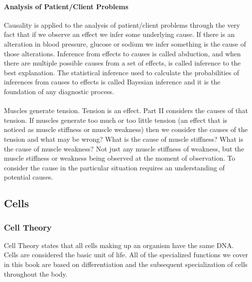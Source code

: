 \paragraph{Analysis of Patient/Client Problems}
Causality is applied to the analysis of patient/client problems through the very fact that if we observe an effect we infer some underlying cause. If there is an alteration in blood pressure, glucose or sodium we infer something is the cause of those alterations. Inference from effects to causes is called abduction, and when there are multiple possible causes from a set of effects, is called inference to the best explanation. The statistical inference used to calculate the probabilities of inferences from causes to effects is called Bayesian inference and it is the foundation of any diagnostic process. 
\paragraph{}
Muscles generate tension. Tension is an effect. Part II considers the causes of that tension. If muscles generate too much or too little tension (an effect that is noticed as muscle stiffness or muscle weakness) then we consider the causes of the tension and what may be wrong? What is the cause of muscle stiffness? What is the cause of muscle weakness? Not just any muscle stiffness of weakness, but the muscle stiffness or weakness being observed at the moment of observation. To consider the cause in the particular situation requires an understanding of potential causes.

\subsection{Cells}

\subsubsection{Cell Theory}

Cell Theory states that all cells making up an organism have the same DNA. Cells are considered the basic unit of life. All of the specialized functions we cover in this book are based on differentiation and the subsequent specialization of cells throughout the body.   
